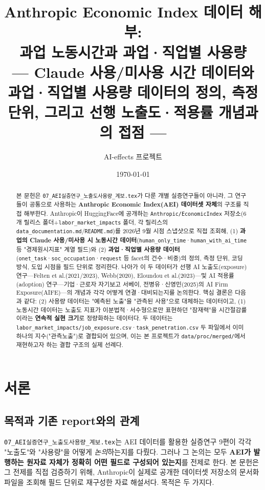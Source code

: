 \documentclass[11pt]{article}
\title{Anthropic Economic Index 데이터 해부:\\[1mm]
과업 노동시간과 과업·직업별 사용량\\[2mm]
\large --- Claude 사용/미사용 시간 데이터와 과업·직업별 사용량 데이터의 정의, 측정 단위, 그리고 선행 노출도·적용률 개념과의 접점 ---}
\author{AI-effects 프로젝트}
\date{\today}
\begin{document}
\maketitle

\begin{abstract}
\noindent 본 문헌은 \texttt{07\_AEI실증연구\_노출도사용량\_계보.tex}가 다룬 개별 실증연구들이 아니라, 그 연구들이 공통으로 사용하는 \textbf{Anthropic Economic Index(AEI) 데이터셋 자체}의 구조를 직접 해부한다. Anthropic이 HuggingFace에 공개하는 \texttt{Anthropic/EconomicIndex} 저장소(6개 릴리스 폴더+\texttt{labor\_market\_impacts} 폴더, 각 릴리스의 \texttt{data\_documentation.md}/\texttt{README.md})를 2026년 9월 시점 스냅샷으로 직접 조회해, (1) \textbf{과업의 Claude 사용/미사용 시 노동시간 데이터}(\texttt{human\_only\_time}·\texttt{human\_with\_ai\_time} 등 "경제원시지표" 계열 필드)와 (2) \textbf{과업·직업별 사용량 데이터}(\texttt{onet\_task}·\texttt{soc\_occupation}·\texttt{request} 등 facet의 건수·비중)의 정의, 측정 단위, 코딩 방식, 도입 시점을 필드 단위로 정리한다. 나아가 이 두 데이터가 선행 AI 노출도(exposure) 연구---Felten et al.(2021/2023), Webb(2020), Eloundou et al.(2023)---및 AI 적용률(adoption) 연구---기업·근로자 자기보고 서베이, 전병유·신영민(2025)의 AI Firm Exposure(AIFE)---의 개념과 각각 어떻게 연결·대비되는지를 논의한다. 핵심 결론은 다음과 같다: (2) 사용량 데이터는 "예측된 노출"을 "관측된 사용"으로 대체하는 데이터이고, (1) 노동시간 데이터는 노출도 지표가 이분법적·서수형으로만 표현하던 "잠재력"을 시간절감률이라는 \textbf{연속적 실현 크기}로 정량화하는 데이터다. 두 데이터는 \texttt{labor\_market\_impacts/job\_exposure.csv}·\texttt{task\_penetration.csv} 두 파일에서 이미 하나의 지수("관측노출")로 결합되어 있으며, 이는 본 프로젝트가 \texttt{data/proc/merged/}에서 재현하고자 하는 결합 구조의 실제 선례다.
\end{abstract}

\tableofcontents

\section{서론}

\subsection{목적과 기존 report와의 관계}

\texttt{07\_AEI실증연구\_노출도사용량\_계보.tex}는 AEI 데이터를 활용한 실증연구 9편이 각각 "노출도"와 "사용량"을 어떻게 \emph{논의}하는지를 다뤘다. 그러나 그 논의는 모두 \textbf{AEI가 발행하는 원자료 자체가 정확히 어떤 필드로 구성되어 있는지}를 전제로 한다. 본 문헌은 그 전제를 직접 검증하기 위해, Anthropic이 실제로 공개한 데이터셋 저장소의 문서화 파일을 조회해 필드 단위로 재구성한 자료 해설서다. 목적은 두 가지다.
\end{document}
